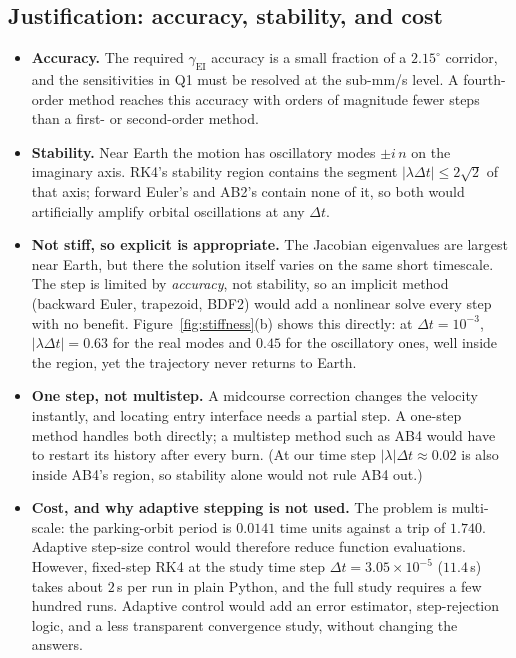 \documentclass[11pt]{article}
\newcommand{\gEI}{\gamma_{\mathrm{EI}}}
\begin{document}
\subsection{Justification: accuracy, stability, and cost}

\begin{itemize}[leftmargin=2em]
  \item \textbf{Accuracy.} The required $\gEI$ accuracy is a small fraction of a $2.15^\circ$ corridor, and the sensitivities in Q1 must be resolved at the sub-mm/s level. A fourth-order method reaches this accuracy with orders of magnitude fewer steps than a first- or second-order method.
  \item \textbf{Stability.} Near Earth the motion has oscillatory modes $\pm i\,n$ on the imaginary axis. RK4's stability region contains the segment $|\lambda\Delta t| \le 2\sqrt{2}$ of that axis; forward Euler's and AB2's contain none of it, so both would artificially amplify orbital oscillations at any $\Delta t$.
  \item \textbf{Not stiff, so explicit is appropriate.} The Jacobian eigenvalues are largest near Earth, but there the solution itself varies on the same short timescale. The step is limited by \emph{accuracy}, not stability, so an implicit method (backward Euler, trapezoid, BDF2) would add a nonlinear solve every step with no benefit. Figure~\ref{fig:stiffness}(b) shows this directly: at $\Delta t = 10^{-3}$, $|\lambda\Delta t| = 0.63$ for the real modes and $0.45$ for the oscillatory ones, well inside the region, yet the trajectory never returns to Earth.
  \item \textbf{One step, not multistep.} A midcourse correction changes the velocity instantly, and locating entry interface needs a partial step. A one-step method handles both directly; a multistep method such as AB4 would have to restart its history after every burn. (At our time step $|\lambda|\Delta t \approx 0.02$ is also inside AB4's region, so stability alone would not rule AB4 out.)
  \item \textbf{Cost, and why adaptive stepping is not used.} The problem is multi-scale: the parking-orbit period is $0.0141$ time units against a trip of $1.740$. Adaptive step-size control would therefore reduce function evaluations. However, fixed-step RK4 at the study time step $\Delta t = 3.05\times 10^{-5}$ ($11.4$\,s) takes about $2$\,s per run in plain Python, and the full study requires a few hundred runs. Adaptive control would add an error estimator, step-rejection logic, and a less transparent convergence study, without changing the answers.
\end{itemize}
\end{document}
